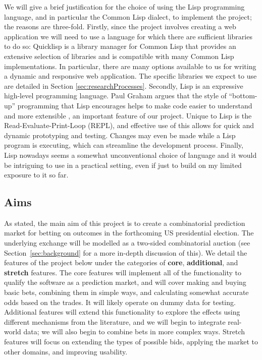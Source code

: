\documentclass[10pt,a4paper]{article}
\theoremstyle{plain}
\theoremstyle{definition}
\begin{document}
	We will give a brief justification for the choice of using the Lisp
	programming language, and in particular the Common Lisp dialect, to
	implement the project; the reasons are three-fold. Firstly, since the
	project involves creating a web application we will need to use a language
	for which there are sufficient libraries to do so: Quicklisp
	\cite{Quicklisp} is a library manager for Common Lisp that provides an
	extensive selection of libraries and is compatible with many Common Lisp
	implementations. In particular, there are many options available to us for
	writing a dynamic and responsive web application. The specific libraries we
	expect to use are detailed in Section \ref{sec:researchProcesses}.
	Secondly, Lisp is an expressive high-level programming language. Paul
	Graham argues that the style of ``bottom-up'' programming that Lisp
	encourages helps to make code easier to understand and more extensible
	\cite{OnLisp}, an important feature of our project. Unique to Lisp is the
	Read-Evaluate-Print-Loop (REPL), and effective use of this allows for quick
	and dynamic prototyping and testing. Changes may even be made while a Lisp
	program is executing, which can streamline the development process.
	Finally, Lisp nowadays seems a somewhat unconventional choice of language
	and it would be intriguing to use in a practical setting, even if just to
	build on my limited exposure to it so far.

	\subsection{Aims}

	As stated, the main aim of this project is to create a combinatorial
	prediction market for betting on outcomes in the forthcoming US
	presidential election. The underlying exchange will be modelled as a
	two-sided combinatorial auction (see Section~\ref{sec:background} for a
	more in-depth discussion of this). We detail the features of the project
	below under the categories of \textbf{core}, \textbf{additional}, and
	\textbf{stretch} features. The core features will implement all of the
	functionality to qualify the software as a prediction market, and will
	cover making and buying basic bets, combining them in simple ways, and
	calculating somewhat accurate odds based on the trades. It will likely
	operate on dummy data for testing. Additional features will extend this
	functionality to explore the effects using different mechanisms from the
	literature, and we will begin to integrate real-world data; we will also
	begin to combine bets in more complex ways. Stretch features will focus on
	extending the types of possible bids, applying the market to other domains,
	and improving usability.
\end{document}
